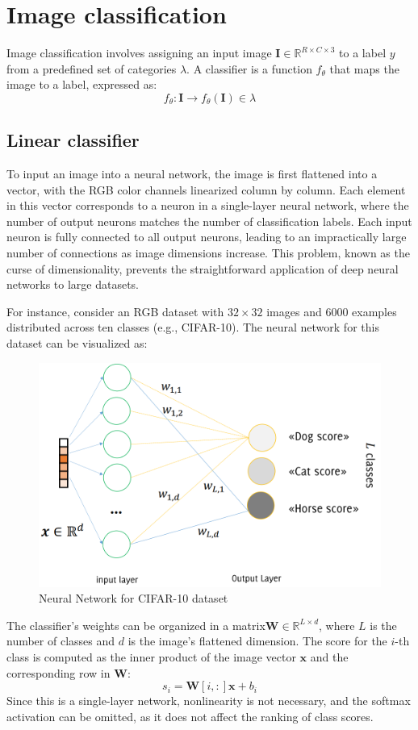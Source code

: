 \section{Image classification}

Image classification involves assigning an input image $\mathbf{I}\in\mathbb{R}^{R\times C \times 3}$ to a label $y$ from a predefined set of categories $\lambda$. 
A classifier is a function $f_\theta$ that maps the image to a label, expressed as:
\[f_\theta:\mathbf{I} \rightarrow f_\theta(\mathbf{I})\in\lambda\]

\subsection{Linear classifier}
To input an image into a neural network, the image is first flattened into a vector, with the RGB color channels linearized column by column.
Each element in this vector corresponds to a neuron in a single-layer neural network, where the number of output neurons matches the number of classification labels.
Each input neuron is fully connected to all output neurons, leading to an impractically large number of connections as image dimensions increase. 
This problem, known as the curse of dimensionality, prevents the straightforward application of deep neural networks to large datasets.

For instance, consider an RGB dataset with $32 \times 32$ images and 6000 examples distributed across ten classes (e.g., CIFAR-10). 
The neural network for this dataset can be visualized as:
\begin{figure}[H]
    \centering
    \includegraphics[width=0.75\linewidth]{images/nn.png}
    \caption{Neural Network for CIFAR-10 dataset}
\end{figure}
The classifier's weights can be organized in a matrix$\mathbf{W}\in\mathbb{R}^{L\times d}$, where $L$ is the number of classes and $d$ is the image's flattened dimension.
The score for the $i$-th class is computed as the inner product of the image vector $\mathbf{x}$ and the corresponding row in $\mathbf{W}$: 
\[s_i=\mathbf{W}[i,:]\mathbf{x}+b_i\]
Since this is a single-layer network, nonlinearity is not necessary, and the softmax activation can be omitted, as it does not affect the ranking of class scores.

